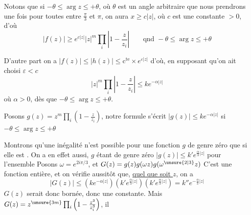 Notons que si $-\theta\leq\arg z\leq+\theta$, où $\theta$ est
un angle arbitraire que nous prendrons une
fois pour toutes entre $\frac{\pi}{3}$ et $\pi$, on
aura $x\geq c|z|$, où $c$ est une
constante $>0$, d'où 
\[ |f(z)|\geq e^{c|z|}|z|^m\prod_i\left|1-\frac z{z_i}\right|\qquad\text{qnd }-\theta\leq\arg z\leq+\theta \]

D'autre part on a $|f(z)|\leq|h(z)|\leq \mathrm c^{\mathrm{te}}\times e^{\varepsilon|z|}$
d'où, en supposant qu'on ait choisi $\varepsilon<c$
\[ |z|^m\prod_i\left|1-\frac{z}{z_i}\right|\leq k e^{-\alpha|z|} \]
où $\alpha>0$, dès que $-\theta\leq\arg z\leq+\theta$.

Posons $g(z)=z^m\prod_i(1-\frac z{z_i})$, notre formule
s'écrit \quad \uline{$|g(z)|\leq ke^{-\alpha|z|}$} \quad si $-\theta\leq\arg z\leq+\theta$

Montrons qu'une  inégalité n'est possible
pour une fonction $g$ de genre zéro que si elle
est  . On a en effet aussi, $g$ étant de genre
zéro \qquad $|g(z)|\leq k'e^{\frac{\alpha}{3}|z|}$ \qquad pour l'ensemble
Posons $\omega=e^{2i\pi/3}$, et $G(z)=g(z)g(\omega z)g(\omega^{\unsure{2|3}}z)$
C'est une fonction entière, et on vérifie
aussitôt que, \uline{quel que soit $z$}, on a
\[ |G(z)|\leq(ke^{-\alpha|z|})(k'e^{\frac{\alpha}{3}|z|})(k'e^{\frac{\alpha}{3}|z|})=k''e^{-\frac{\alpha}{3}|z|} \]
$G(z)$ serait donc bornée, donc une constante.
Mais $G(z)=z^{\unsure{3m}}\prod_i\left(1-\frac{z^3}{z_i^3}\right)$, il

